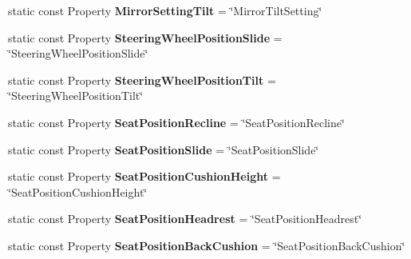 \begin{DoxyCompactItemize}
\item 
\hypertarget{classVehicleProperty_a2ca932f61b72c5d3d11f0bdcefad8d96}{static const Property {\bfseries Mirror\-Setting\-Tilt} = \char`\"{}Mirror\-Tilt\-Setting\char`\"{}}\label{classVehicleProperty_a2ca932f61b72c5d3d11f0bdcefad8d96}

\item 
\hypertarget{classVehicleProperty_a526cb98dbf809a8affff6785f159f997}{static const Property {\bfseries Steering\-Wheel\-Position\-Slide} = \char`\"{}Steering\-Wheel\-Position\-Slide\char`\"{}}\label{classVehicleProperty_a526cb98dbf809a8affff6785f159f997}

\item 
\hypertarget{classVehicleProperty_aca58b520c35739acd692717c6264381f}{static const Property {\bfseries Steering\-Wheel\-Position\-Tilt} = \char`\"{}Steering\-Wheel\-Position\-Tilt\char`\"{}}\label{classVehicleProperty_aca58b520c35739acd692717c6264381f}

\item 
\hypertarget{classVehicleProperty_a66bbcfc91af9bf11536042b8d1f10134}{static const Property {\bfseries Seat\-Position\-Recline} = \char`\"{}Seat\-Position\-Recline\char`\"{}}\label{classVehicleProperty_a66bbcfc91af9bf11536042b8d1f10134}

\item 
\hypertarget{classVehicleProperty_a005604680e4e58d285f0918ef6212449}{static const Property {\bfseries Seat\-Position\-Slide} = \char`\"{}Seat\-Position\-Slide\char`\"{}}\label{classVehicleProperty_a005604680e4e58d285f0918ef6212449}

\item 
\hypertarget{classVehicleProperty_ab218303d4e45858c16144b33c5d0c6cb}{static const Property {\bfseries Seat\-Position\-Cushion\-Height} = \char`\"{}Seat\-Position\-Cushion\-Height\char`\"{}}\label{classVehicleProperty_ab218303d4e45858c16144b33c5d0c6cb}

\item 
\hypertarget{classVehicleProperty_ad8b62a1dea61b1d37203010ebb95f8cb}{static const Property {\bfseries Seat\-Position\-Headrest} = \char`\"{}Seat\-Position\-Headrest\char`\"{}}\label{classVehicleProperty_ad8b62a1dea61b1d37203010ebb95f8cb}

\item 
\hypertarget{classVehicleProperty_a355f4eaaa3189f081d5ab5bfaada5a0a}{static const Property {\bfseries Seat\-Position\-Back\-Cushion} = \char`\"{}Seat\-Position\-Back\-Cushion\char`\"{}}\label{classVehicleProperty_a355f4eaaa3189f081d5ab5bfaada5a0a}


\end{DoxyCompactItemize}
